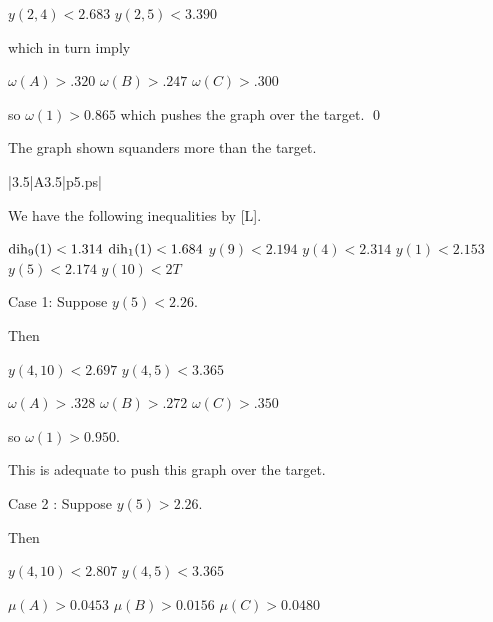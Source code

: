 $y(2,4)<2.683$ \newline
$y(2,5)<3.390$ \newline

which in turn imply

$\omega(A)>.320$ \newline
$\omega(B)>.247$ \newline
$\omega(C)>.300$ \newline

so $\omega(1)>0.865$ which pushes the graph over the target. \qed



\bigskip



 The graph shown 
squanders more than the target.  \endproclaim

\gram|3.5|A3.5|p5.ps|  %


We have the following inequalities by [L].

$\operatorname{dih}_9(1) < 1.314$ \newline
$\operatorname{dih}_1(1) < 1.684$ \newline
$y(9)<2.194$ \newline
$y(4)<2.314$ \newline
$y(1)<2.153$ \newline
$y(5)<2.174$ \newline
$y(10)<2T$ \newline


Case 1: Suppose $y(5)<2.26$.

Then 

$y(4,10)<2.697$ \newline
$y(4,5)<3.365$ \newline

$\omega(A)>.328$ \newline
$\omega(B)>.272$ \newline
$\omega(C)>.350$ \newline

so $\omega(1)>0.950$.  

This is adequate to push this graph over the target.

Case 2 : Suppose $y(5)>2.26$.

Then

$y(4,10)<2.807$ \newline
$y(4,5)<3.365$ \newline

$\mu(A)>0.0453$ \newline
$\mu(B)>0.0156$ \newline
$\mu(C)>0.0480$ \newline


